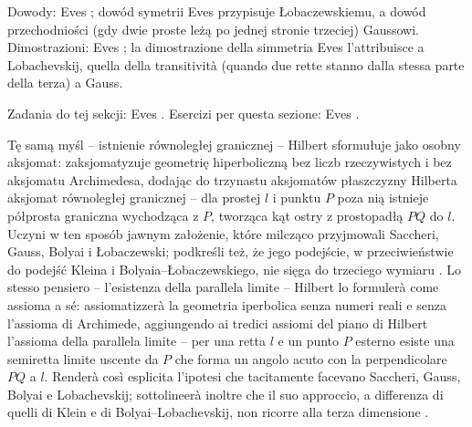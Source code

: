 Dowody: Eves \cite[s. 292--295]{eves1_1972}; dowód symetrii Eves przypisuje Łobaczewskiemu, a dowód przechodniości (gdy dwie proste leżą po jednej stronie trzeciej) Gaussowi. %
Dimostrazioni: Eves \cite[p. 292--295]{eves1_1972}; la dimostrazione della simmetria Eves l'attribuisce a Lobachevskij, quella della transitività (quando due rette stanno dalla stessa parte della terza) a Gauss. %

Zadania do tej sekcji: Eves \cite[s. 288--291]{eves1_1972}. %
Esercizi per questa sezione: Eves \cite[p. 288--291]{eves1_1972}. %

Tę samą myśl -- istnienie równoległej granicznej -- Hilbert sformułuje jako osobny aksjomat: zaksjomatyzuje geometrię hiperboliczną bez liczb rzeczywistych i bez aksjomatu Archimedesa, dodając do trzynastu aksjomatów płaszczyzny Hilberta aksjomat równoległej granicznej -- dla prostej $l$ i punktu $P$ poza nią istnieje półprosta graniczna wychodząca z $P$, tworząca kąt ostry z prostopadłą $PQ$ do $l$. %
Uczyni w ten sposób jawnym założenie, które milcząco przyjmowali Saccheri, Gauss, Bolyai i Łobaczewski; podkreśli też, że jego podejście, w przeciwieństwie do podejść Kleina i Bolyaia--Łobaczewskiego, nie sięga do trzeciego wymiaru \cite[s. 209]{greenberg_2010}. %
Lo stesso pensiero -- l'esistenza della parallela limite -- Hilbert lo formulerà come assioma a sé: assiomatizzerà la geometria iperbolica senza numeri reali e senza l'assioma di Archimede, aggiungendo ai tredici assiomi del piano di Hilbert l'assioma della parallela limite -- per una retta $l$ e un punto $P$ esterno esiste una semiretta limite uscente da $P$ che forma un angolo acuto con la perpendicolare $PQ$ a $l$. %
Renderà così esplicita l'ipotesi che tacitamente facevano Saccheri, Gauss, Bolyai e Lobachevskij; sottolineerà inoltre che il suo approccio, a differenza di quelli di Klein e di Bolyai--Lobachevskij, non ricorre alla terza dimensione \cite[p. 209]{greenberg_2010}. %
